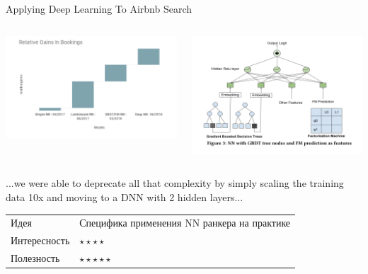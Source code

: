 \documentclass[11pt,aspectratio=169,handout]{beamer}
\begin{document}
\begin{frame}{Applying Deep Learning To Airbnb Search \cite{AIRBNB}}

\begin{columns}
\begin{column}{0.45\textwidth} 
\begin{center}
\includegraphics[scale=0.3]{images/airbnb-progression.png}
\end{center}
\end{column}
\begin{column}{0.45\textwidth}
\begin{center}
\includegraphics[scale=0.3]{images/airbnb-gbdt.png}
\end{center}
\end{column}
\end{columns}

\begin{tcolorbox}[colback=info!5,colframe=info!80,title=]
...we were able to deprecate all that complexity by simply scaling the training data 10x and moving to a DNN with 2 hidden layers...
\end{tcolorbox}

\vfill
\begin{small}
\begin{tabular}{l l}
Идея & Специфика применения NN ранкера на практике \\
Интересность & $\star\star\star\star$ \\
Полезность & $\star\star\star\star\star$
\end{tabular}
\end{small}

\end{frame}
\end{document}
